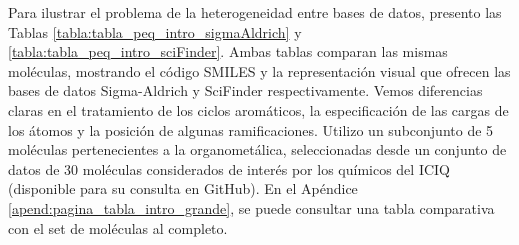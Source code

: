  Para ilustrar el problema de la heterogeneidad entre bases de datos, presento las Tablas \ref{tabla:tabla_peq_intro_sigmaAldrich} y \ref{tabla:tabla_peq_intro_sciFinder}. Ambas tablas comparan las mismas moléculas, mostrando el código SMILES y la representación visual que ofrecen las bases de datos Sigma-Aldrich y SciFinder respectivamente. Vemos diferencias claras en el tratamiento de los ciclos aromáticos, la especificación de las cargas de los átomos y la posición de algunas ramificaciones. Utilizo un subconjunto de 5 moléculas pertenecientes a la organometálica, seleccionadas desde un conjunto de datos de 30 moléculas considerados de interés por los químicos del ICIQ (disponible para su consulta en GitHub). En el Apéndice \ref{apend:pagina_tabla_intro_grande}, se puede consultar una tabla comparativa con el set de moléculas al completo. 





